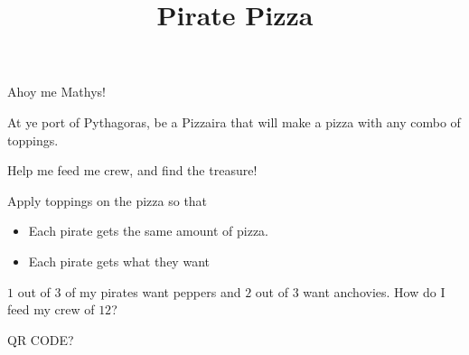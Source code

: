 \documentclass{../exhibit}
\title{Pirate Pizza}
\begin{document}
\begin{context}
  Ahoy me Mathys!


  At ye port of Pythagoras, be a Pizzaira that will make a pizza with
  any combo of toppings.


  Help me feed me crew, and find the treasure!
\end{context}



\begin{directions}
  Apply toppings on the pizza so that
  \begin{itemize}
  \item Each pirate gets the same amount of pizza.
  \item Each pirate gets what they want
  \end{itemize}
\end{directions}



\begin{example}
  $1$ out of $3$ of my pirates want peppers and $2$ out of $3$ want
  anchovies. How do I feed my crew of $12$?
\begin{center}
\end{center}
\end{example}



\begin{mathConnections}
  QR CODE?
\end{mathConnections}
\end{document}
